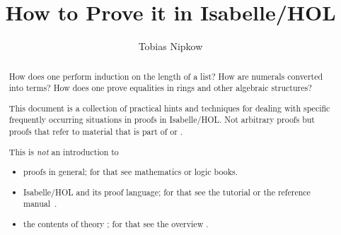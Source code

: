 \documentclass[11pt,a4paper]{report}
\begin{document}
\title{How to Prove it in Isabelle/HOL}
\author{Tobias Nipkow}
\maketitle


\begin{abstract}
  How does one perform induction on the length of a list? How are numerals
  converted into  terms? How does one prove equalities in rings
  and other algebraic structures?

  This document is a collection of practical hints and techniques for dealing
  with specific frequently occurring situations in proofs in Isabelle/HOL.
  Not arbitrary proofs but proofs that refer to material that is part of
   or .

  This is \emph{not} an introduction to
\begin{itemize}
\item proofs in general; for that see mathematics or logic books.
\item Isabelle/HOL and its proof language; for that see the tutorial
  \cite{ProgProve} or the reference manual~\cite{IsarRef}.
\item the contents of theory ; for that see the overview
  \cite{Main}.
\end{itemize}
\end{abstract}

\setcounter{tocdepth}{1}
\tableofcontents






\end{document}

